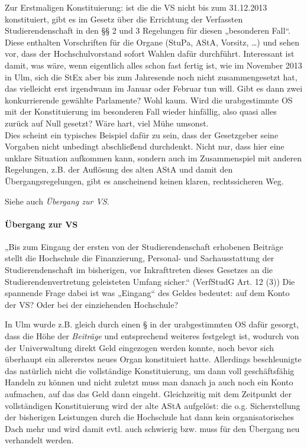 \documentclass[
10pt,
a4paper,
twoside,								%
titlepage=false,							%
draft=false								%
]{scrartcl}
\begin{document}
Zur Erstmaligen Konstituierung: ist die die VS nicht bis zum 31.12.2013 konstituiert, gibt es im Gesetz über die Errichtung der Verfassten Studierendenschaft in den §§ 2 und 3 Regelungen für diesen „besonderen Fall“. Diese enthalten Vorschriften für die Organe (StuPa, AStA, Vorsitz, …) und sehen vor, dass der Hochschulvorstand sofort Wahlen dafür durchführt. Interessant ist damit, was wäre, wenn eigentlich alles schon fast fertig ist, wie im November 2013 in Ulm, sich die StEx aber bis zum Jahresende noch nicht zusammengesetzt hat, das vielleicht erst irgendwann im Januar oder Februar tun will. Gibt es dann zwei konkurrierende gewählte Parlamente? Wohl kaum. Wird die urabgestimmte OS mit der Konstituierung im besonderen Fall wieder hinfällig, also quasi alles zurück auf Null gesetzt? Wäre hart, viel Mühe umsonst.\\
Dies scheint ein typisches Beispiel dafür zu sein, dass der Gesetzgeber seine Vorgaben nicht unbedingt abschließend durchdenkt. Nicht nur, dass hier eine unklare Situation aufkommen kann, sondern auch im Zusammenspiel mit anderen Regelungen, z.B. der Auflösung des alten AStA und damit den Übergangsregelungen, gibt es anscheinend keinen klaren, rechtssicheren Weg.

Siehe auch \emph{Übergang zur VS}.


\paragraph{Übergang zur VS}

„Bis zum Eingang der ersten von der Studierendenschaft erhobenen Beiträge stellt die Hochschule die Finanzierung, Personal- und Sachausstattung der Studierendenschaft im bisherigen, vor Inkrafttreten dieses Gesetzes an die Studierendenvertretung geleisteten Umfang sicher.“ (VerfStudG Art. 12 (3)) Die spannende Frage dabei ist was „Eingang“ des Geldes bedeutet: auf dem Konto der VS? Oder bei der einziehenden Hochschule?

In Ulm wurde z.B. gleich durch einen § in der urabgestimmten OS dafür gesorgt, dass die Höhe der \emph{Beiträge} und entsprechend weiteres festgelegt ist, wodurch von der Univerwaltung direkt Geld eingezogen werden konnte, noch bevor sich überhaupt ein allererstes neues Organ konstituiert hatte. Allerdings beschleunigte das natürlich nicht die vollständige Konstituierung, um dann voll geschäftsfähig Handeln zu können und nicht zuletzt muss man danach ja auch noch ein Konto aufmachen, auf das das Geld dann eingeht. Gleichzeitig mit dem Zeitpunkt der vollständigen Konstituierung wird der alte AStA aufgelöst: die o.g. Sicherstellung der bisherigen Leistungen durch die Hochschule hat dann kein organisatorisches Dach mehr und wird damit evtl. auch schwierig bzw. muss für den Übergang neu verhandelt werden.
\end{document}
